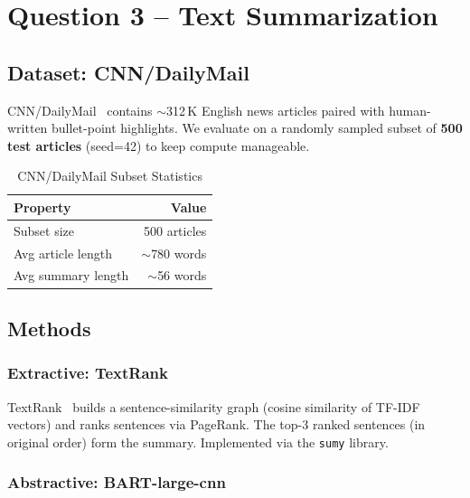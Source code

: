 \section{Question 3 -- Text Summarization}

\subsection{Dataset: CNN/DailyMail}

CNN/DailyMail~\cite{nallapati2016abstractive} contains $\sim$312\,K English
news articles paired with human-written bullet-point highlights.
We evaluate on a randomly sampled subset of \textbf{500 test articles}
(seed=42) to keep compute manageable.

\begin{table}[H]
  \centering
  \caption{CNN/DailyMail Subset Statistics}
  \label{tab:q3_data}
  \begin{tabular}{lr}
    \toprule
    \textbf{Property} & \textbf{Value} \\
    \midrule
    Subset size       & 500 articles \\
    Avg article length & $\sim$780 words \\
    Avg summary length & $\sim$56 words \\
    \bottomrule
  \end{tabular}
\end{table}

\subsection{Methods}

\subsubsection{Extractive: TextRank}

TextRank~\cite{mihalcea2004textrank} builds a sentence-similarity graph
(cosine similarity of TF-IDF vectors) and ranks sentences via PageRank.
The top-3 ranked sentences (in original order) form the summary.
Implemented via the \texttt{sumy} library.

\subsubsection{Abstractive: BART-large-cnn}

